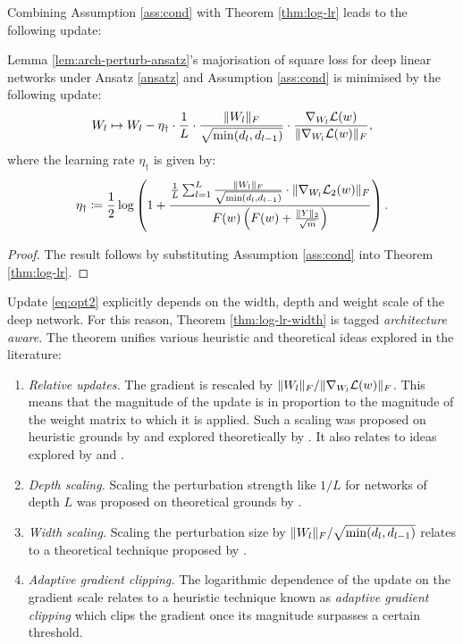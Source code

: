 \begin{refsection}
Combining Assumption \ref{ass:cond} with Theorem \ref{thm:log-lr} leads to the following update:
\begin{theorem}\label{thm:log-lr-width}
Lemma \ref{lem:arch-perturb-ansatz}'s majorisation of square loss for deep linear networks under Ansatz \ref{ansatz} and Assumption \ref{ass:cond} is minimised by the following update:
\begin{equation}\label{eq:opt2}
    W_l \mapsto W_l - \eta_\dagger \cdot \frac{1}{L} \cdot \frac{\Vert {W_l} \Vert_F}{\sqrt{\min(d_l,d_{l-1})}} \cdot \frac{ \nabla_{W_l} \mathcal{L}(w)}{\Vert { \nabla_{W_l} \mathcal{L}(w)} \Vert_F},
\end{equation}
where the learning rate $\eta_\dagger$ is given by:
\begin{equation}\label{eq:log-lr}
    \eta_\dagger \coloneqq \frac{1}{2} \log\left(1 + \frac{\frac{1}{L}\sum_{l=1}^L \frac{\Vert {W_l} \Vert_F}{\sqrt{\min(d_l,d_{l-1})}} \cdot \Vert {\nabla_{W_l} \mathcal{L}_2(w)} \Vert_F}{F(w)\left(F(w) + \frac{\Vert {Y} \Vert_2}{\sqrt{m}}\right)}\right).
\end{equation}
\end{theorem}
\begin{proof}
    The result follows by substituting Assumption \ref{ass:cond} into Theorem \ref{thm:log-lr}.
\end{proof}
Update \ref{eq:opt2} explicitly depends on the width, depth and weight scale of the deep network. For this reason, Theorem \ref{thm:log-lr-width} is tagged \textit{architecture aware}. The theorem unifies various heuristic and theoretical ideas explored in the literature:
\begin{enumerate}
    \item \textit{Relative updates.} The gradient is rescaled by $\Vert {W_l} \Vert_F / \Vert {\nabla_{W_l}\mathcal{L}(w)} \Vert_F$. This means that the magnitude of the update is in proportion to the magnitude of the weight matrix to which it is applied. Such a scaling was proposed on heuristic grounds by \citet{You:EECS-2017-156} and explored theoretically by \citet{my-fromage}. It also relates to ideas explored by \citet{carbonnelle2019layer} and \citet{my-nero}.
    \item \textit{Depth scaling.} Scaling the perturbation strength like $1/L$ for networks of depth $L$ was proposed on theoretical grounds by \citet{my-fromage}.
    \item \textit{Width scaling.} Scaling the perturbation size by $\Vert {W_l} \Vert_F/\sqrt{\min(d_l,d_{l-1})}$ relates to a theoretical technique proposed by \citet{yang2021tuning}.
    \item \textit{Adaptive gradient clipping.} The logarithmic dependence of the update on the gradient scale relates to a heuristic technique known as \textit{adaptive gradient clipping} \citep{pmlr-v139-brock21a} which clips the gradient once its magnitude surpasses a certain threshold.
\end{enumerate}


\end{refsection}
